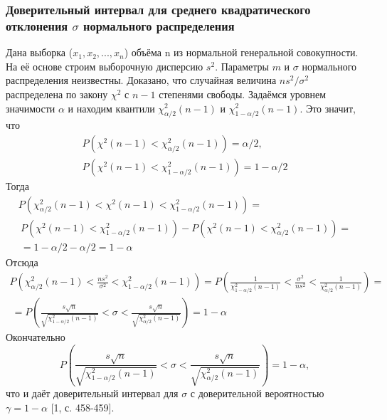 \subsubsection{Доверительный интервал для среднего квадратического отклонения $\sigma$ нормального распределения}
Дана выборка ($x_{1},x_{2}, ... ,x_{n}$) объёма n из нормальной генеральной совокупности. На её основе строим выборочную дисперсию $s^{2}$. Параметры $m$ и $\sigma$ нормального распределения неизвестны. Доказано, что случайная величина $ns^{2}/\sigma^{2}$ распределена по закону $\chi^{2}$ с $n-1$ степенями свободы.
\newline
Задаёмся уровнем значимости $\alpha$ и находим квантили $\chi^{2}_{\alpha/2}(n-1)$ и $\chi^{2}_{1-\alpha/2}(n-1)$.
\newline
Это значит, что 
\begin{equation}
\begin{split}
P\left(\chi^{2}(n-1) < \chi^{2}_{\alpha/2}(n-1)\right) = \alpha/2, \\
P\left(\chi^{2}(n-1) < \chi^{2}_{1-\alpha/2}(n-1)\right) = 1-\alpha/2
\end{split}
\end{equation}
Тогда
\begin{multline}
P\left(\chi^{2}_{\alpha/2}(n-1) < \chi^{2}(n-1) < \chi^{2}_{1-\alpha/2}(n-1)\right) = \\\
P\left(\chi^{2}(n-1) < \chi^{2}_{1-\alpha/2}(n-1)\right) -P\left(\chi^{2}(n-1) < \chi^{2}_{\alpha/2}(n-1)\right) = \\\ = 1 - \alpha/2 -\alpha/2 = 1 - \alpha
\label{P_chi_2}
\end{multline}
Отсюда
\begin{multline}
P\left(\chi^{2}_{\alpha/2}(n-1) < \frac{ns^{2}}{\sigma^{2}} < \chi^{2}_{1-\alpha/2}(n-1)\right) =
P\left(\frac{1}{\chi^{2}_{1-\alpha/2}(n-1)} < \frac{\sigma^{2}}{ns^{2}} < \frac{1}{\chi^{2}_{\alpha/2}(n-1)} \right) = \\\ =
P\left(\frac{s\sqrt{n}}{\sqrt{\chi^{2}_{1-\alpha/2}(n-1)}} < \sigma <  \frac{s\sqrt{n}}{\sqrt{\chi^{2}_{\alpha/2}(n-1)}}\right) = 1- \alpha
\label{interv}
\end{multline}
Окончательно
\begin{equation}
P\left(\frac{s\sqrt{n}}{\sqrt{\chi^{2}_{1-\alpha/2}(n-1)}} < \sigma <  \frac{s\sqrt{n}}{\sqrt{\chi^{2}_{\alpha/2}(n-1)}}\right) = 1- \alpha,
\label{fin_interval}
\end{equation}
что и даёт доверительный интервал для $\sigma$ с доверительной вероятностью $\gamma = 1 - \alpha$ [1, с. 458-459].

